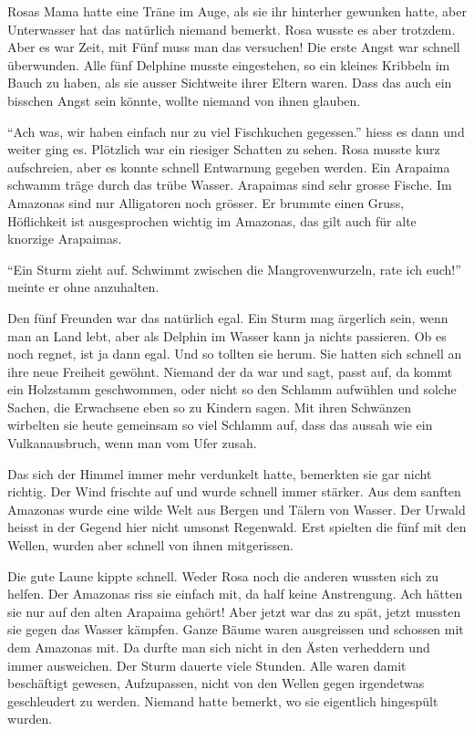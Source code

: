 Rosas Mama hatte eine Träne im Auge, als sie ihr hinterher gewunken hatte, aber Unterwasser hat das natürlich niemand bemerkt. Rosa wusste es aber trotzdem. Aber es war Zeit, mit Fünf muss man das versuchen! Die erste Angst war schnell überwunden. Alle fünf Delphine musste eingestehen, so ein kleines Kribbeln im Bauch zu haben, als sie ausser Sichtweite ihrer Eltern waren. Dass das auch ein bisschen Angst sein könnte, wollte niemand von ihnen glauben.

\enquote{Ach was, wir haben einfach nur zu viel Fischkuchen gegessen.} hiess es dann und weiter ging es. Plötzlich war ein riesiger Schatten zu sehen. Rosa musste kurz aufschreien, aber es konnte schnell Entwarnung gegeben werden. Ein Arapaima schwamm träge durch das trübe Wasser. Arapaimas sind sehr grosse Fische. Im Amazonas sind nur Alligatoren noch grösser. Er brummte einen Gruss, Höflichkeit ist ausgesprochen wichtig im Amazonas, das gilt auch für alte knorzige Arapaimas.

\enquote{Ein Sturm zieht auf. Schwimmt zwischen die Mangrovenwurzeln, rate ich euch!} meinte er ohne anzuhalten. 

Den fünf Freunden war das natürlich egal. Ein Sturm mag ärgerlich sein, wenn man an Land lebt, aber als Delphin im Wasser kann ja nichts passieren. Ob es noch regnet, ist ja dann egal. Und so tollten sie herum. Sie hatten sich schnell an ihre neue Freiheit gewöhnt. Niemand der da war und sagt, passt auf, da kommt ein Holzstamm geschwommen, oder nicht so den Schlamm aufwühlen und solche Sachen, die Erwachsene eben so zu Kindern sagen. Mit ihren Schwänzen wirbelten sie heute gemeinsam so viel Schlamm auf, dass das aussah wie ein Vulkanausbruch, wenn man vom Ufer zusah.

Das sich der Himmel immer mehr verdunkelt hatte, bemerkten sie gar nicht richtig. Der Wind frischte auf und wurde schnell immer stärker. Aus dem sanften Amazonas wurde eine wilde Welt aus Bergen und Tälern von Wasser. Der Urwald heisst in der Gegend hier nicht umsonst Regenwald. Erst spielten die fünf mit den Wellen, wurden aber schnell von ihnen mitgerissen.

Die gute Laune kippte schnell. Weder Rosa noch die anderen wussten sich zu helfen. Der Amazonas riss sie einfach mit, da half keine Anstrengung. Ach hätten sie nur auf den alten Arapaima gehört! Aber jetzt war das zu spät, jetzt mussten sie gegen das Wasser kämpfen. Ganze Bäume waren ausgreissen und schossen mit dem Amazonas mit. Da durfte man sich nicht in den Ästen verheddern und immer ausweichen. Der Sturm dauerte viele Stunden. Alle waren damit beschäftigt gewesen, Aufzupassen, nicht von den Wellen gegen irgendetwas geschleudert zu werden. Niemand hatte bemerkt, wo sie eigentlich hingespült wurden.

